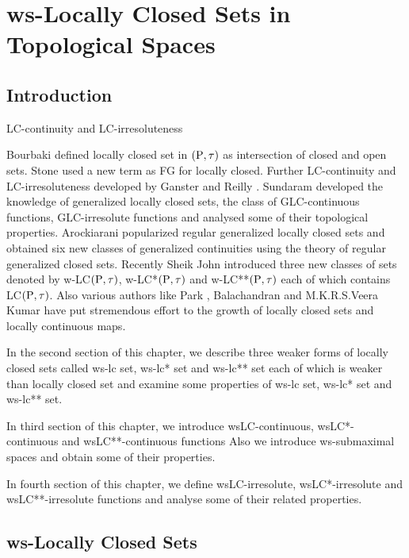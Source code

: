 \chapter{ws-Locally Closed Sets in Topological Spaces}
\graphicspath{{Chapter6/Chapter6Figs/EPS/}{Chapter6/Chapter6Figs/}}

\section{Introduction}\label{sec6.1}

LC-continuity and LC-irresoluteness

Bourbaki \cite{key17} defined locally closed set in $(\mathrm{P},\tau)$ as intersection of closed and open sets. Stone \cite{Stone} used a new term as FG for locally closed. Further LC-continuity and LC-irresoluteness developed by Ganster and Reilly \cite{key37} . Sundaram \cite{key89} developed the knowledge of generalized locally closed sets, the class of GLC-continuous functions, GLC-irresolute functions and analysed some of their topological properties. Arockiarani \cite{key4} popularized regular generalized locally closed sets and obtained six new classes of generalized continuities using the theory of regular generalized closed sets. Recently Sheik John \cite{key83} introduced three new classes of sets denoted by w-LC$(\mathrm{P}, \tau)$, w-LC{*}$(\mathrm{P}, \tau)$ and w-LC{*}{*}$(\mathrm{P}, \tau)$ each of which contains LC$(\mathrm{P}, \tau)$. Also various authors like Park \cite{key75}, Balachandran \cite{key11} and M.K.R.S.Veera Kumar \cite{key92} have put stremendous effort to the growth of locally closed sets and locally continuous maps.

In the second section of this chapter, we describe three weaker forms of locally closed sets called ws-lc set, ws-lc* set and ws-lc{*}{*} set each of which is weaker than locally closed set and examine some properties of ws-lc set, ws-lc* set and ws-lc{*}{*} set. 

\newpage

In third section of this chapter, we introduce wsLC-continuous, wsLC*-continuous and wsLC{*}{*}-continuous functions Also we introduce ws-submaximal spaces and obtain some of their properties.

In fourth section of this chapter, we define wsLC-irresolute, wsLC*-irresolute and wsLC**-irresolute functions and analyse some of their related properties.

\section{ws-Locally Closed Sets}\label{sec6.2}

